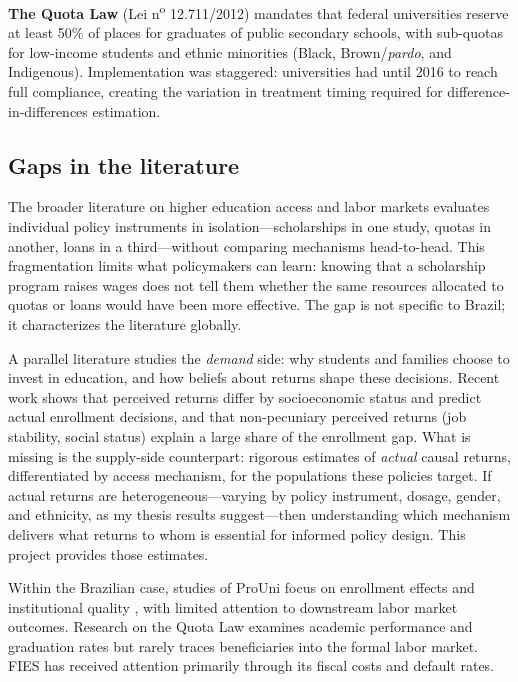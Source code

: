 \documentclass[a4paper,11pt]{article}
\begin{document}
\textbf{The Quota Law} (Lei n\textsuperscript{o} 12.711/2012) mandates that federal universities reserve at least 50\% of places for graduates of public secondary schools, with sub-quotas for low-income students and ethnic minorities (Black, Brown/\textit{pardo}, and Indigenous). Implementation was staggered: universities had until 2016 to reach full compliance, creating the variation in treatment timing required for difference-in-differences estimation.

\subsection{Gaps in the literature}

The broader literature on higher education access and labor markets evaluates individual policy instruments in isolation---scholarships in one study, quotas in another, loans in a third---without comparing mechanisms head-to-head. This fragmentation limits what policymakers can learn: knowing that a scholarship program raises wages does not tell them whether the same resources allocated to quotas or loans would have been more effective. The gap is not specific to Brazil; it characterizes the literature globally.

A parallel literature studies the \textit{demand} side: why students and families choose to invest in education, and how beliefs about returns shape these decisions. Recent work shows that perceived returns differ by socioeconomic status and predict actual enrollment decisions, and that non-pecuniary perceived returns (job stability, social status) explain a large share of the enrollment gap. What is missing is the supply-side counterpart: rigorous estimates of \textit{actual} causal returns, differentiated by access mechanism, for the populations these policies target. If actual returns are heterogeneous---varying by policy instrument, dosage, gender, and ethnicity, as my thesis results suggest---then understanding which mechanism delivers what returns to whom is essential for informed policy design. This project provides those estimates.

Within the Brazilian case, studies of ProUni focus on enrollment effects \citep{cataldo2020} and institutional quality \citep{aprile2009}, with limited attention to downstream labor market outcomes. Research on the Quota Law examines academic performance and graduation rates but rarely traces beneficiaries into the formal labor market. FIES has received attention primarily through its fiscal costs and default rates.
\end{document}
